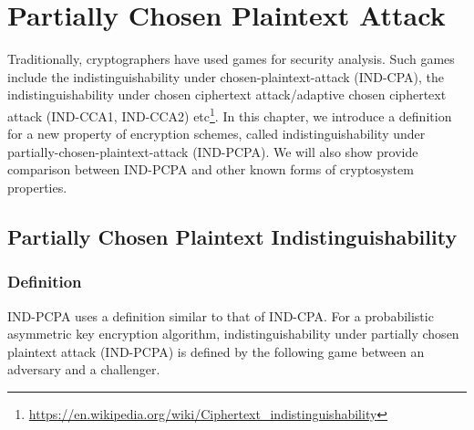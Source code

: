\chapter{Partially Chosen Plaintext Attack}\label{ch:pcpa}

Traditionally, cryptographers have used games for security analysis. Such games
include the indistinguishability under chosen-plaintext-attack (IND-CPA), the
indistinguishability under chosen ciphertext attack/adaptive chosen ciphertext
attack (IND-CCA1, IND-CCA2)
etc\footnote{\url{https://en.wikipedia.org/wiki/Ciphertext_indistinguishability}}.
In this chapter, we introduce a definition for a new property of encryption
schemes, called indistinguishability under partially-chosen-plaintext-attack
(IND-PCPA). We will also show provide comparison between IND-PCPA and other
known forms of cryptosystem properties.

\section{Partially Chosen Plaintext Indistinguishability}\label{sec:indpcpa}

\subsection{Definition} IND-PCPA uses a definition similar to that of IND-CPA.
For a probabilistic asymmetric key encryption algorithm, indistinguishability
under partially chosen plaintext attack (IND-PCPA) is defined by the following
game between an adversary and a challenger.

